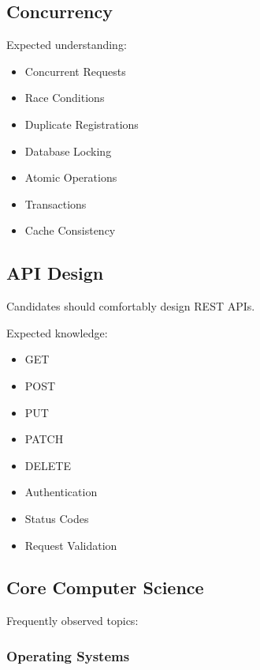 \documentclass[11pt,a4paper]{article}
\begin{document}

\subsection{Concurrency}

Expected understanding:

\begin{itemize}
	\item Concurrent Requests
	\item Race Conditions
	\item Duplicate Registrations
	\item Database Locking
	\item Atomic Operations
	\item Transactions
	\item Cache Consistency
\end{itemize}


\subsection{API Design}

Candidates should comfortably design REST APIs.

Expected knowledge:

\begin{itemize}
	\item GET
	\item POST
	\item PUT
	\item PATCH
	\item DELETE
	\item Authentication
	\item Status Codes
	\item Request Validation
\end{itemize}


\subsection{Core Computer Science}

Frequently observed topics:

\subsubsection{Operating Systems}
\end{document}
